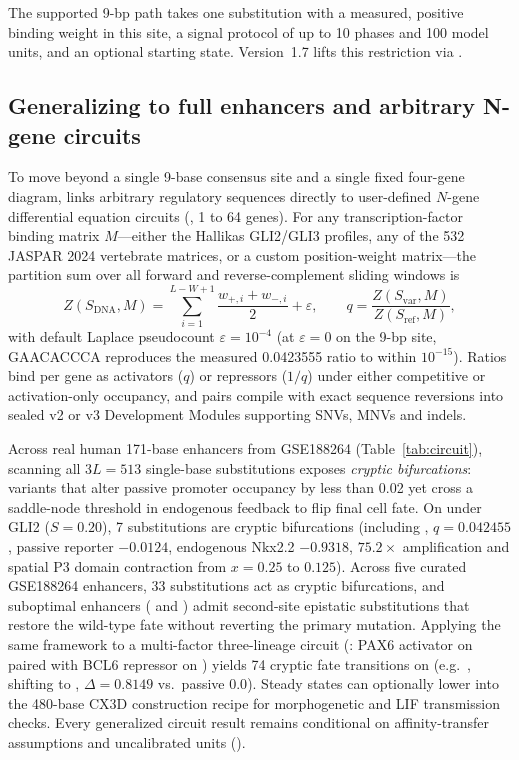 \documentclass[10.5pt,a4paper]{article}
\begin{document}
The supported 9-bp path takes one substitution with a measured, positive binding weight in this site, a signal protocol of up to 10 phases and 100 model units, and an optional starting state. Version~1.7 lifts this restriction via .

\subsection{Generalizing to full enhancers and arbitrary N-gene circuits}\label{sec:circuit}

To move beyond a single 9-base consensus site and a single fixed four-gene diagram,  links arbitrary regulatory sequences directly to user-defined $N$-gene differential equation circuits (, 1 to 64 genes). For any transcription-factor binding matrix $M$—either the Hallikas GLI2/GLI3 profiles, any of the 532 JASPAR 2024 vertebrate matrices, or a custom position-weight matrix—the partition sum over all forward and reverse-complement sliding windows is
\[
Z(S_{\mathrm{DNA}}, M) = \sum_{i=1}^{L-W+1} \frac{w_{+,i} + w_{-,i}}{2} + \varepsilon,
\qquad
q = \frac{Z(S_{\mathrm{var}}, M)}{Z(S_{\mathrm{ref}}, M)},
\]
with default Laplace pseudocount $\varepsilon=10^{-4}$ (at $\varepsilon=0$ on the 9-bp site, GAACACCCA reproduces the measured 0.0423555 ratio to within $10^{-15}$). Ratios bind per gene as activators ($q$) or repressors ($1/q$) under either competitive or activation-only occupancy, and pairs compile with exact sequence reversions into sealed  v2 or v3 Development Modules supporting SNVs, MNVs and indels.

Across real human 171-base enhancers from GSE188264 (Table~\ref{tab:circuit}), scanning all $3L=513$ single-base substitutions exposes \emph{cryptic bifurcations}: variants that alter passive promoter occupancy by less than 0.02 yet cross a saddle-node threshold in endogenous feedback to flip final cell fate. On  under GLI2 ($S=0.20$), 7 substitutions are cryptic bifurcations (including , $q=0.042455$, passive reporter $-0.0124$, endogenous Nkx2.2 $-0.9318$, $75.2\times$ amplification and spatial P3 domain contraction from $x=0.25$ to $0.125$). Across five curated GSE188264 enhancers, 33 substitutions act as cryptic bifurcations, and suboptimal enhancers ( and ) admit second-site epistatic substitutions that restore the wild-type fate without reverting the primary mutation. Applying the same framework to a multi-factor three-lineage circuit (:  PAX6 activator on  paired with  BCL6 repressor on ) yields 74 cryptic fate transitions on  (e.g.\ , shifting  to , $\Delta=0.8149$ vs.\ passive $0.0$). Steady states can optionally lower into the 480-base CX3D construction recipe for morphogenetic and LIF transmission checks. Every generalized circuit result remains conditional on affinity-transfer assumptions and uncalibrated units ().
\end{document}
